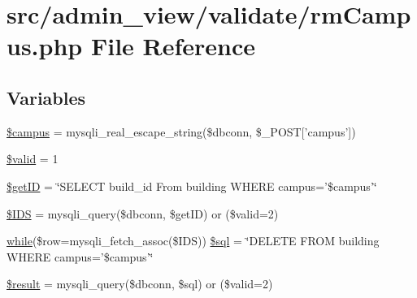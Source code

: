 \hypertarget{rmCampus_8php}{\section{src/admin\-\_\-view/validate/rm\-Campus.php \-File \-Reference}
\label{rmCampus_8php}
}
\subsection*{\-Variables}
\begin{DoxyCompactItemize}
\item 
\hyperlink{rmCampus_8php_a6f0655994f3941d6ab50f681032f899b}{\$campus} = mysqli\-\_\-real\-\_\-escape\-\_\-string(\$dbconn, \$\-\_\-\-P\-O\-S\-T\mbox{[}'campus'\mbox{]})
\item 
\hyperlink{rmCampus_8php_a0587674d27d00ef497e08e53ccf45bbb}{\$valid} = 1
\item 
\hyperlink{rmCampus_8php_aae30003a4d3fab7dc75a19cbfddea7a8}{\$get\-I\-D} = \char`\"{}\-S\-E\-L\-E\-C\-T build\-\_\-id \-From building \-W\-H\-E\-R\-E campus='\$campus'\char`\"{}
\item 
\hyperlink{rmCampus_8php_a046621a0674ef3c7f611b85c330fe1c5}{\$\-I\-D\-S} = mysqli\-\_\-query(\$dbconn, \$get\-I\-D) or (\$valid=2)
\item 
\hyperlink{studentForm_8php_abeb5d2366a9870820ffb1e260d040d8d}{while}(\$row=mysqli\-\_\-fetch\-\_\-assoc(\$\-I\-D\-S)) \hyperlink{rmCampus_8php_a44dd5051c0321c5bf69d18bbc8cc43c3}{\$sql} = \char`\"{}\-D\-E\-L\-E\-T\-E \-F\-R\-O\-M building \-W\-H\-E\-R\-E campus='\$campus'\char`\"{}
\item 
\hyperlink{rmCampus_8php_a112ef069ddc0454086e3d1e6d8d55d07}{\$result} = mysqli\-\_\-query(\$dbconn, \$sql) or (\$valid=2)
\end{DoxyCompactItemize}


